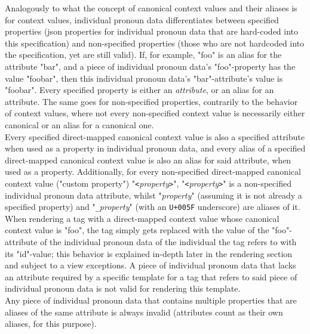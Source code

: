 \documentclass{article}
\begin{document}
    Analogously to what the concept of canonical context values and their aliases is for context values, individual pronoun data differentiates between specified properties (json properties for individual pronoun data that are hard-coded into this specification) and non-specified properties (those who are not hardcoded into the specification, yet are still valid).
    If, for example, "foo" is an alias for the attribute "bar", and a piece of individual pronoun data's "foo"-property has the value "foobar", then this individual pronoun data's "bar"-attribute's value is "foobar".
    Every specified property is either an \emph{attribute}, or an alias for an attribute.
    The same goes for non-specified properties, contrarily to the behavior of context values, where not every non-specified context value is necessarily either canonical or an alias for a canonical one.\\

    Every specified direct-mapped canonical context value is also a specified attribute when used as a property in individual pronoun data, and every alias of a specified direct-mapped canonical context value is also an alias for said attribute, when used as a property.
    Additionally, for every non-specified direct-mapped canonical context value ("custom property") "\texttt{<}\emph{property}\texttt{>}", "\texttt{<}\emph{property}\texttt{>}" is a non-specified individual pronoun data attribute, whilst "\emph{property}" (assuming it is not already a specified property) and "\texttt{\_}\emph{property}" (with an \texttt{U+005F} underscore) are aliases of it.\\

    When rendering a tag with a direct-mapped context value whose canonical context value is "foo", the tag simply gets replaced with the value of the "foo"-attribute of the individual pronoun data of the individual the tag refers to with its "id"-value;
    this behavior is explained in-depth later in the rendering section and subject to a view exceptions.
    A piece of individual pronoun data that lacks an attribute required by a specific template for a tag that refers to said piece of individual pronoun data is not valid for rendering this template.\\

    Any piece of individual pronoun data that contains multiple properties that are aliases of the same attribute is always invalid (attributes count as their own aliases, for this purpose).\\
\end{document}

